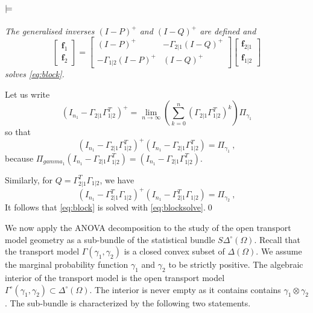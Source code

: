 \documentclass[runningheads]{llncs}
\begin{document}
\paragraph{$\bf\models$} \emph{The generalised inverses $(I-P)^+$ and $(I-Q)^+$ are defined and 
%
  \begin{equation*}
  \begin{bmatrix}
    \bm f_1 \\ \bm f_2
  \end{bmatrix}
=
    \begin{bmatrix}
      (I - P)^+ & - \Gamma_{2|1}(I - Q)^+ \\
- \Gamma_{1|2}(I-P)^+ & (I-Q)^+
    \end{bmatrix}
    \begin{bmatrix}
      \bm f_{2|1} \\ \bm f_{1|2}
    \end{bmatrix}
  \end{equation*}
%
solves \cref{eq:block}.}

  Let us write
%
\begin{equation*}
  (I_{n_1}-\Gamma_{2|1}\Gamma_{1|2}^T)^{+} = \lim_{n\to\infty} \left(\sum_{k=0}^n (\Gamma_{2|1}\Gamma_{1|2}^T)^k\right) \Pi_{\gamma_1}  
\end{equation*}
%
so that
%
\begin{equation*}
  (I_{n_1}-\Gamma_{2|1}\Gamma_{1|2}^T)^{+}(I_{n_1}-\Gamma_{2|1}\Gamma_{1|2}^T) = \Pi_{\gamma_1} \ ,
\end{equation*}
%
because $\Pi_{gamma_1} (I_{n_1}-\Gamma_{2|1}\Gamma_{1|2}^T) = (I_{n_1}-\Gamma_{2|1}\Gamma_{1|2}^T)$.

Similarly, for $Q = \Gamma_{2|1}^T\Gamma_{1|2}$, we have
%
\begin{equation*}
  (I_{n_1}-\Gamma_{2|1}^T\Gamma_{1|2})^{+}(I_{n_1}-\Gamma_{2|1}^T\Gamma_{1|2}) = \Pi_{\gamma_2} \ ,
\end{equation*}
%
It follows that \cref{eq:block} is solved with \cref{eq:blocksolve}.\qed

We now apply the ANOVA decomposition to the study of the open
transport model geometry as a sub-bundle of the statistical bundle
$S\Delta^\circ(\Omega)$. Recall that the transport model
$\Gamma(\gamma_1,\gamma_2)$ is a closed convex subset of
$\Delta(\Omega)$. We assume the marginal probability function
$\gamma_1$ and $\gamma_2$ to be strictly positive. The algebraic
interior of the transport model is the open transport model
$\Gamma^\circ(\gamma_1,\gamma_2) \subset \Delta^\circ(\Omega)$. The
interior is never empty as it contains contains
$\gamma_1 \otimes \gamma_2$. The sub-bundle is characterized by the
following two statements.
\end{document}
